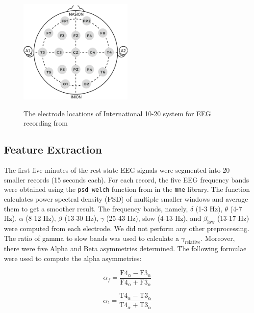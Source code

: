 \documentclass[pdflatex,sn-mathphys]{sn-jnl}%
\theoremstyle{thmstyleone}%
\theoremstyle{thmstyletwo}%
\theoremstyle{thmstylethree}%
\begin{document}
\begin{figure}[h!]
 \centering
  \caption{The electrode locations of International 10-20 system for EEG recording from \cite{wiki:10-20}}
  \includegraphics[width=0.5\textwidth]{Electrodeplacement.png}
  \label{fig:activeelectrode}
\end{figure}

\subsection{Feature Extraction}\label{method:featureExtraction}

The first five minutes of the rest-state EEG signals were segmented into 20 smaller records (15 seconds each). For each record, the five EEG frequency bands were obtained using the \texttt{psd\_welch} function from in the \texttt{mne} library. The function calculates power spectral density (PSD) of multiple smaller windows and average them to get a smoother result. The frequency bands, namely, $\delta$ (1-3 Hz), $\theta$ (4-7 Hz), $\alpha$ (8-12 Hz), $\beta$ (13-30 Hz), $\gamma$ (25-43 Hz), slow (4-13 Hz), and $\beta_{\text{low}}$ (13-17 Hz) were computed from each electrode. We did not perform any other preprocessing. The ratio of gamma to slow bands was used to calculate a $\gamma_{\text{relative}}$. Moreover, there were five Alpha and Beta asymmetries determined. The following formulae were used to compute the alpha asymmetries:

\begin{equation} \label{eq:3}
   \alpha_{f} =\frac{ \text{F4}_{\alpha} - \text{F3}_{\alpha} }{ \text{F4}_{\alpha} + \text{F3}_{\alpha} }
\end{equation}

\begin{equation} \label{eq:4}
    \alpha_{t} =\frac{ \text{T4}_{\alpha} - \text{T3}_{\alpha} }{ \text{T4}_{\alpha} + \text{T3}_{\alpha} }
\end{equation}
\end{document}

